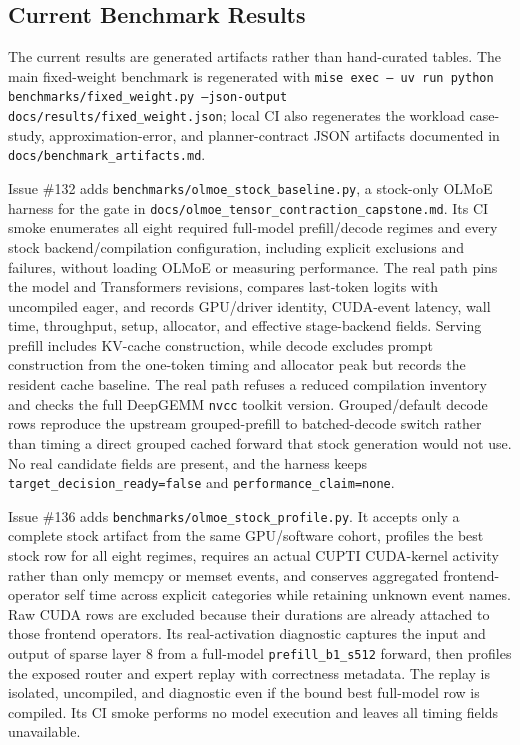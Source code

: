 \documentclass[11pt]{article}
\begin{document}
\subsection{Current Benchmark Results}

The current results are generated artifacts rather than hand-curated tables.
The main fixed-weight benchmark is regenerated with
\texttt{mise exec -- uv run python benchmarks/fixed\_weight.py --json-output
docs/results/fixed\_weight.json}; local CI also regenerates the workload
case-study, approximation-error, and planner-contract JSON artifacts documented
in \texttt{docs/benchmark\_artifacts.md}.

Issue \#132 adds
\texttt{benchmarks/olmoe\_stock\_baseline.py}, a stock-only OLMoE harness for
the gate in \texttt{docs/olmoe\_tensor\_contraction\_capstone.md}. Its CI smoke
enumerates all eight required full-model prefill/decode regimes and every stock
backend/compilation configuration, including explicit exclusions and failures,
without loading OLMoE or measuring performance. The real path pins the model
and Transformers revisions, compares last-token logits with uncompiled eager,
and records GPU/driver identity, CUDA-event latency, wall time, throughput,
setup, allocator, and effective stage-backend fields. Serving prefill includes
KV-cache construction, while decode excludes prompt construction from the
one-token timing and allocator peak but records the resident cache baseline.
The real path refuses a reduced compilation inventory and checks the full
DeepGEMM \texttt{nvcc} toolkit version. Grouped/default decode rows reproduce
the upstream grouped-prefill to batched-decode switch rather than timing a
direct grouped cached forward that stock generation would not use. No real
candidate fields are present, and the harness keeps
\texttt{target\_decision\_ready=false} and
\texttt{performance\_claim=none}.

Issue \#136 adds
\texttt{benchmarks/olmoe\_stock\_profile.py}. It accepts only a complete stock
artifact from the same GPU/software cohort, profiles the best stock row for all
eight regimes, requires an actual CUPTI CUDA-kernel activity rather than only
memcpy or memset events, and conserves aggregated frontend-operator self time
across explicit categories while retaining unknown event names. Raw CUDA rows
are excluded because their durations are already attached to those frontend
operators. Its
real-activation diagnostic captures the input and output of sparse layer 8 from
a full-model \texttt{prefill\_b1\_s512} forward, then profiles the exposed
router and expert replay with correctness metadata. The replay is isolated,
uncompiled, and diagnostic even if the bound best full-model row is compiled.
Its CI smoke performs no model execution and leaves all timing fields
unavailable.
\end{document}
